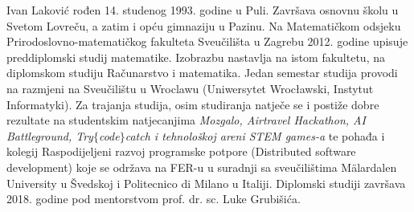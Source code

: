 \documentclass[a4paper,twoside,12pt]{memoir} %
\begin{document}

\begin{cv}
Ivan Laković rođen 14. studenog 1993. godine u Puli. Završava osnovnu školu u Svetom Lovreču, a zatim i opću gimnaziju u Pazinu. Na Matematičkom odsjeku Prirodoslovno-matematičkog fakulteta Sveučilišta u Zagrebu 2012. godine upisuje preddiplomski studij matematike. Izobrazbu nastavlja na istom fakultetu, na diplomskom studiju Računarstvo i matematika. Jedan semestar studija provodi na razmjeni na Sveučilištu u Wroclawu (Uniwersytet Wrocławski, Instytut Informatyki). Za trajanja studija, osim studiranja natječe se i postiže dobre rezultate na studentskim natjecanjima \textit{Mozgalo, Airtravel Hackathon, AI Battleground, Try$\{$code$\}$catch i tehnološkoj areni STEM games-a} te pohađa i kolegij Raspodijeljeni razvoj programske potpore (Distributed software development) koje se održava na FER-u u suradnji sa sveučilištima Mälardalen University u Švedskoj i Politecnico di Milano u Italiji. Diplomski studiji završava 2018. godine pod mentorstvom prof. dr. sc. Luke Grubišića.
\end{cv}
\end{document}
